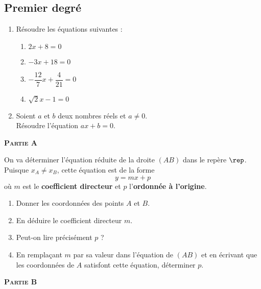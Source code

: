 \documentclass[a4paper,11pt,exos]{nsi} %
\begin{document}
\maketitle

\subsection*{Premier degré}
\exo{}
\begin{enumerate}
    \item 	Résoudre les équations suivantes :			\setlength{\columnseprule}{0pt}
    \begin{multicols}{4}
        \begin{enumerate}[label=\textbullet]
            \item 	$2x+8=0$
            \item 	$-3x+18=0$	
            \item 	$-\dfrac{12}{7}x+\dfrac{4}{21}=0$
            \item 	$\sqrt{2}x-1=0$
        \end{enumerate}
    \end{multicols}
    \item	Soient $a$ et $b$ deux nombres réels et $a\neq 0$.\\
    Résoudre l'équation $ax+b=0$.
\end{enumerate}


\exo{}
\dleft{8.1cm}
{
	\textbf{\textsc{Partie A}}
	
	On va déterminer l'équation réduite de la droite $(AB)$ dans le repère $\rep$. Puisque $x_A\neq x_B$, cette équation est de la forme 
	$$y=mx+p$$
	où $m$ est le \textbf{coefficient directeur} et $p$ l'\textbf{ordonnée à l'origine}.
	\begin{enumerate}
		\item 	Donner les coordonnées des points $A$ et $B$.
		\item 	En déduire le coefficient directeur $m$.
		\item 	Peut-on lire précisément $p$ ?
		\item 	En remplaçant $m$ par sa valeur dans l'équation de $(AB)$ et en écrivant que les coordonnées de $A$ satisfont cette équation, déterminer $p$.\\
	\end{enumerate}
}
{
}
	\textbf{\textsc{Partie B}}
	
\end{document}
